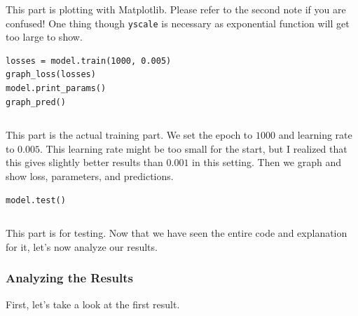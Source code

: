 \documentclass[../../../main.tex]{subfiles}
\begin{document}
This part is plotting with Matplotlib. Please refer to the second
note if you are confused! One thing though \verb|yscale| is necessary
as exponential function will get too large to show.

\begin{jupyter}
\begin{lstlisting}[style=jin]
losses = model.train(1000, 0.005)
graph_loss(losses)
model.print_params()
graph_pred()
\end{lstlisting}
\begin{lstlisting}[style=jout]
\end{lstlisting}
\end{jupyter}

This part is the actual training part. We set the epoch to $1000$
and learning rate to $0.005$. This learning rate might be too small
for the start, but I realized that this gives slightly better results
than $0.001$ in this setting. Then we graph and show loss, parameters,
and predictions.

\begin{jupyter}
\begin{lstlisting}[style=jin]
model.test()
\end{lstlisting}
\begin{lstlisting}[style=jout]
\end{lstlisting}
\end{jupyter}

This part is for testing. Now that we have seen the entire code and
explanation for it, let's now analyze our results.

\subsubsection{Analyzing the Results}

First, let's take a look at the first result.
\end{document}
